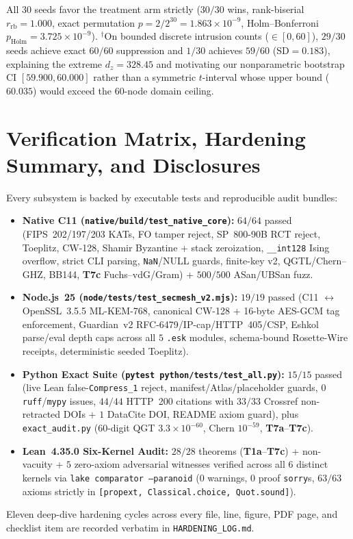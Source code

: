 \documentclass[11pt,reqno]{amsart}
\newcommand{\code}[1]{\texttt{\small #1}}
\begin{document}
All $30$ seeds favor the treatment arm strictly ($30/30$ wins, rank-biserial $r_{\mathrm{rb}}=1.000$, exact permutation $p = 2 / 2^{30} = 1.863 \times 10^{-9}$, Holm--Bonferroni $p_{\mathrm{Holm}} = 3.725 \times 10^{-9}$). $^{\dagger}$On bounded discrete intrusion counts ($\in [0,60]$), $29/30$ seeds achieve exact $60/60$ suppression and $1/30$ achieves $59/60$ ($\mathrm{SD}=0.183$), explaining the extreme $d_z = 328.45$ and motivating our nonparametric bootstrap CI $[59.900, 60.000]$ rather than a symmetric $t$-interval whose upper bound ($60.035$) would exceed the $60$-node domain ceiling.

\section{Verification Matrix, Hardening Summary, and Disclosures}
\label{sec:verify}

Every subsystem is backed by executable tests and reproducible audit bundles:
\begin{itemize}[leftmargin=1.6em,itemsep=1pt,topsep=3pt]
  \item \textbf{Native C11 (\code{native/build/test\_native\_core}):} $64/64$ passed (FIPS~202/197/203 KATs, FO tamper reject, SP~800-90B RCT reject, Toeplitz, CW-128, Shamir Byzantine + stack zeroization, \code{\_\_int128} Ising overflow, strict CLI parsing, \code{NaN}/NULL guards, finite-key v2, QGTL/Chern--GHZ, BB144, \textbf{T7c} Fuchs--vdG/Gram) + $500/500$ ASan/UBSan fuzz.
  \item \textbf{Node.js~25 (\code{node/tests/test\_secmesh\_v2.mjs}):} $19/19$ passed (C11 $\leftrightarrow$ OpenSSL~3.5.5 ML-KEM-768, canonical CW-128 + 16-byte AES-GCM tag enforcement, Guardian~v2 RFC-6479/IP-cap/HTTP~405/CSP, Eshkol parse/eval depth caps across all $5$ \code{.esk} modules, schema-bound Rosette-Wire receipts, deterministic seeded Toeplitz).
  \item \textbf{Python Exact Suite (\code{pytest python/tests/test\_all.py}):} $15/15$ passed (live Lean false-\code{Compress\_1} reject, manifest/Atlas/placeholder guards, $0$ \code{ruff}/\code{mypy} issues, $44/44$ HTTP~200 citations with $33/33$ Crossref non-retracted DOIs + $1$ DataCite DOI, README axiom guard), plus \code{exact\_audit.py} ($60$-digit QGT $3.3\times 10^{-60}$, Chern $10^{-59}$, \textbf{T7a}--\textbf{T7c}).
  \item \textbf{Lean~4.35.0 Six-Kernel Audit:} $28/28$ theorems (\textbf{T1a}--\textbf{T7c}) + non-vacuity + $5$ zero-axiom adversarial witnesses verified across all $6$ distinct kernels via \code{lake comparator --paranoid} ($0$ warnings, $0$ proof \code{sorry}s, $63/63$ axioms strictly in \code{[propext, Classical.choice, Quot.sound]}).
\end{itemize}
Eleven deep-dive hardening cycles across every file, line, figure, PDF page, and checklist item are recorded verbatim in \code{HARDENING\_LOG.md}.
\end{document}
